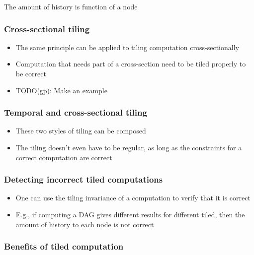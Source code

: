 \documentclass[11pt, reqno]{amsart}
\theoremstyle{definition}
\theoremstyle{remark}
\begin{document}
The amount of history is function of a node

\subsubsection{Cross-sectional tiling}

\begin{itemize}
  \item The same principle can be applied to tiling computation
        cross-sectionally
  \item Computation that needs part of a cross-section need to be tiled
        properly to be correct
  \item TODO(gp): Make an example
\end{itemize}

\subsubsection{Temporal and cross-sectional tiling}

\begin{itemize}
  \item These two styles of tiling can be composed
  \item The tiling doesn't even have to be regular, as long as the constraints
        for a correct computation are correct
\end{itemize}

\subsubsection{Detecting incorrect tiled computations}

\begin{itemize}
  \item One can use the tiling invariance of a computation to verify that it
        is correct
  \item E.g., if computing a DAG gives different results for different tiled,
        then the amount of history to each node is not correct
\end{itemize}

\subsubsection{Benefits of tiled computation}
\end{document}
